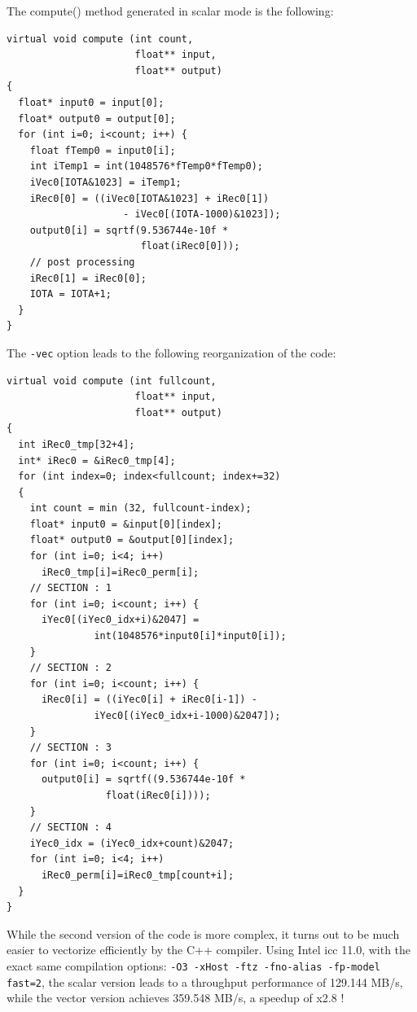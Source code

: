 The compute() method generated in scalar mode is the following:

\begin{lstlisting}
virtual void compute (int count, 
                      float** input, 
                      float** output) 
{
  float* input0 = input[0];
  float* output0 = output[0];
  for (int i=0; i<count; i++) {
    float fTemp0 = input0[i];
    int iTemp1 = int(1048576*fTemp0*fTemp0);
    iVec0[IOTA&1023] = iTemp1;
    iRec0[0] = ((iVec0[IOTA&1023] + iRec0[1])
                    - iVec0[(IOTA-1000)&1023]);
    output0[i] = sqrtf(9.536744e-10f * 
                       float(iRec0[0]));
    // post processing
    iRec0[1] = iRec0[0];
    IOTA = IOTA+1;
  }
}
\end{lstlisting}

The \lstinline!-vec! option leads to the following reorganization of the code:
\begin{lstlisting}
virtual void compute (int fullcount, 
                      float** input, 
                      float** output) 
{
  int iRec0_tmp[32+4];
  int* iRec0 = &iRec0_tmp[4];
  for (int index=0; index<fullcount; index+=32) 
  {
    int count = min (32, fullcount-index);
    float* input0 = &input[0][index];
    float* output0 = &output[0][index];
    for (int i=0; i<4; i++) 
      iRec0_tmp[i]=iRec0_perm[i];
    // SECTION : 1
    for (int i=0; i<count; i++) {
      iYec0[(iYec0_idx+i)&2047] =
               int(1048576*input0[i]*input0[i]);
    }
    // SECTION : 2
    for (int i=0; i<count; i++) {
      iRec0[i] = ((iYec0[i] + iRec0[i-1]) - 
               iYec0[(iYec0_idx+i-1000)&2047]);
    }
    // SECTION : 3
    for (int i=0; i<count; i++) {
      output0[i] = sqrtf((9.536744e-10f * 
                 float(iRec0[i])));
    }
    // SECTION : 4
    iYec0_idx = (iYec0_idx+count)&2047;
    for (int i=0; i<4; i++)
      iRec0_perm[i]=iRec0_tmp[count+i];
  }
}
\end{lstlisting}

While the second version of the code is more complex, it turns out to be much easier to vectorize efficiently by the C++ compiler. Using Intel icc 11.0, with the exact same compilation options: \texttt{-O3 -xHost -ftz -fno-alias -fp-model fast=2}, the scalar version leads to a throughput performance of 129.144  MB/s, while the vector version achieves 359.548  MB/s, a speedup of x2.8 ! 

